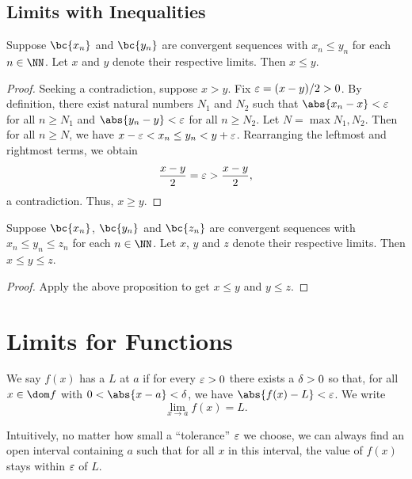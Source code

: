 \subsection{Limits with Inequalities}

\begin{proposition}
    Suppose $\bc{x_n}$ and $\bc{y_n}$ are convergent sequences with $x_n \leq y_n$ for each $n \in \NN$. Let $x$ and $y$ denote their respective limits. Then $x \leq y$.
\end{proposition}
\begin{proof}
    Seeking a contradiction, suppose $x > y$. Fix $\varepsilon = (x-y)/2 > 0$. By definition, there exist natural numbers $N_1$ and $N_2$ such that $\abs{x_n - x} < \ve$ for all $n \geq N_1$ and $\abs{y_n - y} < \ve$ for all $n \geq N_2$. Let $N = \max{N_1, N_2}$. Then for all $n \geq N$, we have $x - \varepsilon < x_n \leq y_n < y + \varepsilon$. Rearranging the leftmost and rightmost terms, we obtain \[\frac{x-y}{2} = \varepsilon > \frac{x-y}{2},\] a contradiction. Thus, $x \geq y$.
\end{proof}

\begin{theorem}
    Suppose $\bc{x_n}$, $\bc{y_n}$ and $\bc{z_n}$ are convergent sequences with $x_n \leq y_n \leq z_n$ for each $n \in \NN$. Let $x$, $y$ and $z$ denote their respective limits. Then $x \leq y \leq z$.
\end{theorem}
\begin{proof}
    Apply the above proposition to get $x \leq y$ and $y \leq z$.
\end{proof}

\section{Limits for Functions}

\begin{definition}
    We say $f(x)$ has a  $L$ at $a$ if for every $\varepsilon > 0$ there exists a $\delta > 0$ so that, for all $x \in \dom f$ with $0 < \abs{x - a} < \de$, we have $\abs{f(x) - L} < \ve$. We write \[\lim_{x \to a} f(x) = L.\]
\end{definition}

Intuitively, no matter how small a ``tolerance'' $\varepsilon$ we choose, we can always find an open interval containing $a$ such that for all $x$ in this interval, the value of $f(x)$ stays within $\varepsilon$ of $L$.

